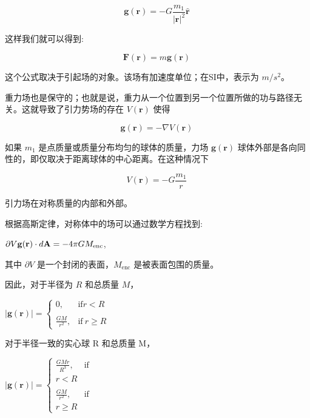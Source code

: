 \begin{equation}
\mathbf{g}(\mathbf{r}) = -G \frac{m_1}{|\mathbf{r}|^2} \hat{\mathbf{r}}~
\end{equation}

这样我们就可以得到:

\begin{equation}
\mathbf{F}(\mathbf{r}) = m \mathbf{g}(\mathbf{r})~
\end{equation}

这个公式取决于引起场的对象。该场有加速度单位；在SI中，表示为 $m/s^2$。

重力场也是保守的；也就是说，重力从一个位置到另一个位置所做的功与路径无关。这就导致了引力势场的存在 $V(\mathbf{r})$ 使得

\begin{equation}
\mathbf{g}(\mathbf{r}) = -\nabla V(\mathbf{r})~
\end{equation}

如果 $m_1$ 是点质量或质量分布均匀的球体的质量，力场 $\mathbf{g}(\mathbf{r})$ 球体外部是各向同性的，即仅取决于距离球体的中心距离。在这种情况下

\begin{equation}
V(\mathbf{r}) = -G \frac{m_1}{r}~
\end{equation}

引力场在对称质量的内部和外部。

根据高斯定律，对称体中的场可以通过数学方程找到:

$\partial V \\ \mathbf{g}(\mathbf{r}) \cdot d\mathbf{A} = -4\pi GM_{\text{enc}}$,

其中 $\partial V$ 是一个封闭的表面，$M_{\text{enc}}$ 是被表面包围的质量。

因此，对于半径为 $R$ 和总质量 $M$，

$\left| \mathbf{g}(\mathbf{r}) \right| = 
\begin{cases}
0, & \text{if}  r < R \\\\
\frac{GM}{r^2}, & \text{if} \ r \geq R
\end{cases}$

对于半径一致的实心球 R 和总质量 M，

$\left| \mathbf{g}(\mathbf{r}) \right| = 
\begin{cases}
\frac{GMr}{R^3}, & \text{if} \\ r < R \\\\
\frac{GM}{r^2}, & \text{if} \\ r \geq R
\end{cases}$
